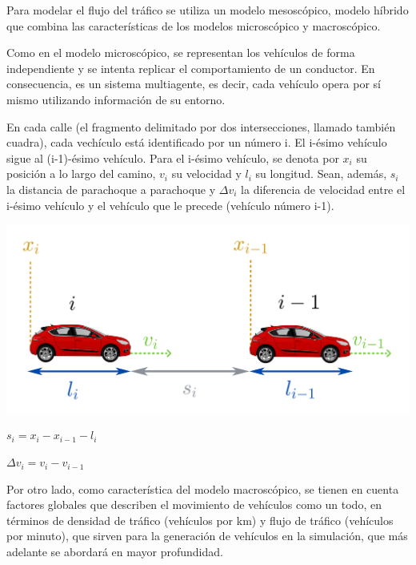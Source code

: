 \documentclass[colorinlistoftodos,twoside,twocolumn]{article} %
\begin{document}
	Para modelar el flujo del tráfico se utiliza un modelo mesosc\'opico, modelo híbrido que combina las características de los modelos microscópico y macroscópico.
	
	Como en el modelo microsc\'opico, se representan los vehículos de forma independiente y se intenta replicar el comportamiento de un conductor. En consecuencia, es un sistema multiagente, es decir, cada vehículo opera por sí mismo utilizando información de su entorno.
	
	En cada calle (el fragmento delimitado por dos intersecciones, llamado tambi\'en cuadra), cada vech\'iculo est\'a identificado por un número i. El i-ésimo vehículo sigue al (i-1)-ésimo vehículo. Para el i-ésimo vehículo, se denota por $ x_{i} $ su posición a lo largo del camino, $ v_{i} $ su velocidad y $ l_{i} $ su longitud. Sean, adem\'as, $ s_{i} $ la distancia de parachoque a parachoque y $ \Delta v_{i} $ la diferencia de velocidad entre el i-ésimo vehículo y el vehículo que le precede (vehículo número i-1).
	
	\begin{center}
		\includegraphics[width=\columnwidth]{microscopic_model.png}
	\end{center}
	
	\begin{center}
		$ s_{i} = x_{i} - x_{i-1} - l_{i} $
	
		$ \Delta v_{i} = v_{i} - v_{i-1} $
	\end{center}
	
	Por otro lado, como caracter\'istica del modelo macrosc\'opico, se tienen en cuenta factores globales que describen el movimiento de vehículos como un todo, en términos de densidad de tráfico (vehículos por km) y flujo de tráfico (vehículos por minuto), que sirven para la generación de vehículos en la simulación, que más adelante se abordará en mayor profundidad.
	
	
\end{document}
